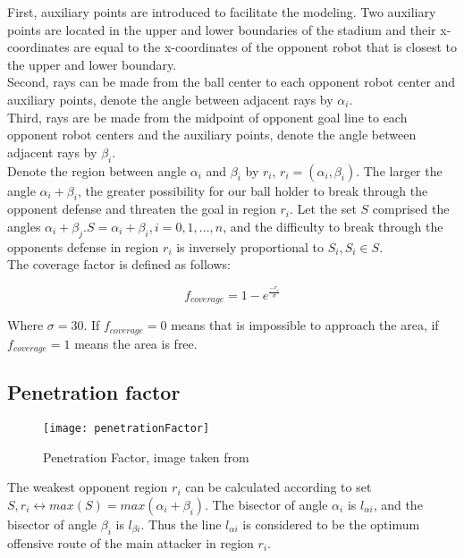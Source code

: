 \documentclass[
10pt, %
a4paper, %
oneside, %
headinclude,footinclude, %
BCOR5mm, %
]{scrartcl}
\begin{document}
First, auxiliary points are introduced to facilitate the modeling. Two auxiliary points are located in the upper and lower boundaries of the stadium and their x-coordinates are equal to the x-coordinates of the opponent robot that is closest to the upper and lower boundary.\\

Second, rays can be made from the ball center to each opponent robot center and auxiliary points, denote the angle between adjacent rays by $\alpha_i$. \\

Third, rays are be made from the midpoint of opponent goal line to each opponent robot centers and the auxiliary points, denote the angle between adjacent rays by $\beta_i$. \\

Denote the region between angle $\alpha_i$ and $\beta_i$ by $r_i$, $r_i = (\alpha_i, \beta_i)$. The larger the angle $\alpha_i + \beta_i$, the greater possibility for our ball holder to break through the opponent defense and threaten the goal in region $r_i$. Let the set $S$ comprised the angles $\alpha_i + \beta_j. S = {\alpha_i + \beta_i}, i = 0, 1, . . . , n$, and the difficulty to break through the opponents defense in region $r_i$ is inversely proportional to $S_i, S_i \in S $.\\

The coverage factor is defined as follows:

\begin{equation}
	f_{coverage} = 1 - e^{\frac{-r_i}{\sigma}}	
\end{equation}

Where $\sigma = 30$.  If $f_{coverage} = 0$ means that is impossible to approach the area, if $f_{coverage} = 1$ means the area is free.

\subsection{Penetration factor}

\begin{figure}
	\centering
	\texttt{[image: penetrationFactor]}
	\caption{Penetration Factor, image taken from \cite{shi2015research}}
	\label{fig:fig}
\end{figure}

The weakest opponent region $r_i$ can be calculated according to set $S , r_i \leftrightarrow max(S ) = max(\alpha_i + \beta_i)$. The bisector of angle $\alpha_i$ is $l_{\alpha i}$, and the bisector of angle $\beta_i$ is $l_{\beta i}$. Thus the line $l_{\alpha i}$ is considered to be the optimum offensive route of the main attacker in region $r_i$. \\
\end{document}

